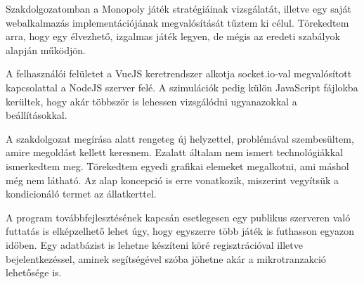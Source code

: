 
Szakdolgozatomban a Monopoly játék stratégiáinak vizsgálatát, illetve egy saját webalkalmazás implementációjának megvalósítását tűztem ki célul. Törekedtem arra, hogy egy élvezhető, izgalmas játék legyen, de mégis az eredeti szabályok alapján működjön.

A felhasználói felületet a VueJS keretrendszer alkotja socket.io-val megvalósított kapcsolattal a NodeJS szerver felé. A szimulációk pedig külön JavaScript fájlokba kerültek, hogy akár többször is lehessen vizsgálódni ugyanazokkal a beállításokkal.

A szakdolgozat megírása alatt rengeteg új helyzettel, problémával szembesültem, amire megoldást kellett keresnem. Ezalatt általam nem ismert technológiákkal ismerkedtem meg. Törekedtem egyedi grafikai elemeket megalkotni, ami máshol még nem látható. Az alap koncepció is erre vonatkozik, miszerint vegyítsük a kondicionáló termet az állatkerttel.

A program továbbfejlesztésének kapcsán esetlegesen egy publikus szerveren való futtatás is elképzelhető lehet úgy, hogy egyszerre több játék is futhasson egyazon időben. Egy adatbázist is lehetne készíteni köré regisztrációval illetve bejelentkezéssel, aminek segítségével szóba jöhetne akár a mikrotranzakció lehetősége is.  
